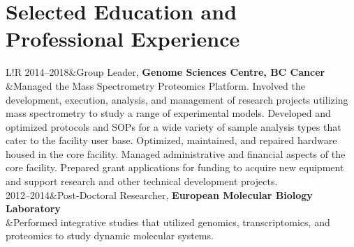\documentclass[11pt]{article}
\newcommand\VRule{\color{lightgray}\vrule width 0.5pt}
\begin{document}
{\section*{Selected Education and Professional Experience}
{\setlength{\extrarowheight}{4pt}%
\begin{tabular}{L!{\VRule}R}
	2014--2018&{Group Leader, }{\bf Genome Sciences Centre, BC Cancer}\\
	&Managed the Mass Spectrometry Proteomics Platform. Involved the development, execution, analysis, and management of research projects utilizing mass spectrometry to study a range of experimental models. Developed and optimized protocols and SOPs for a wide variety of sample analysis types that cater to the facility user base. Optimized, maintained, and repaired hardware housed in the core facility. Managed administrative and financial aspects of the core facility. Prepared grant applications for funding to acquire new equipment and support research and other technical development projects.\\
	2012--2014&{Post-Doctoral Researcher, }{\bf European Molecular Biology Laboratory}\\
	&Performed integrative studies that utilized genomics, transcriptomics, and proteomics to study dynamic molecular systems.\\
\end{tabular}

}}
\end{document}
